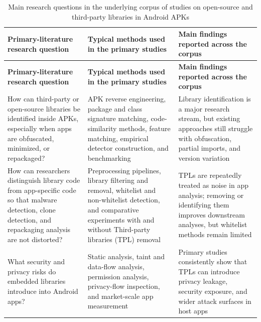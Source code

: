 \documentclass[12pt,a4paper]{report}
\begin{document}
{\small
\setlength{\tabcolsep}{4pt}
\renewcommand{\arraystretch}{2.25}
\begin{longtable}{>{\raggedright\arraybackslash}p{}>{\raggedright\arraybackslash}p{}>{\raggedright\arraybackslash}p{}}
\caption{Main research questions in the underlying corpus of studies on open-source and third-party libraries in Android APKs}\label{tab:review-corpus-questions}\\
\hline
\textbf{Primary-literature research question} & \textbf{Typical methods used in the primary studies} & \textbf{Main findings reported across the corpus} \\
\hline
\endfirsthead
\hline
\textbf{Primary-literature research question} & \textbf{Typical methods used in the primary studies} & \textbf{Main findings reported across the corpus} \\
\hline
\endhead
\hline
\endfoot
How can third-party or open-source libraries be identified inside APKs, especially when apps are obfuscated, minimized, or repackaged? \parencite{zhanResearchThirdPartyLibraries2022,zhanAutomatedThirdpartyLibrary2021} & APK reverse engineering, package and class signature matching, code-similarity methods, feature matching, empirical detector construction, and benchmarking & Library identification is a major research stream, but existing approaches still struggle with obfuscation, partial imports, and version variation \\

How can researchers distinguish library code from app-specific code so that malware detection, clone detection, and repackaging analysis are not distorted? \parencite{zhanResearchThirdPartyLibraries2022} & Preprocessing pipelines, library filtering and removal, whitelist and non-whitelist detection, and comparative experiments with and without Third-party libraries (TPL) removal & TPLs are repeatedly treated as noise in app analysis; removing or identifying them improves downstream analyses, but whitelist methods remain limited \\

What security and privacy risks do embedded libraries introduce into Android apps? \parencite{zhanResearchThirdPartyLibraries2022} & Static analysis, taint and data-flow analysis, permission analysis, privacy-flow inspection, and market-scale app measurement & Primary studies consistently show that TPLs can introduce privacy leakage, security exposure, and wider attack surfaces in host apps \\


\end{longtable}}
\end{document}
